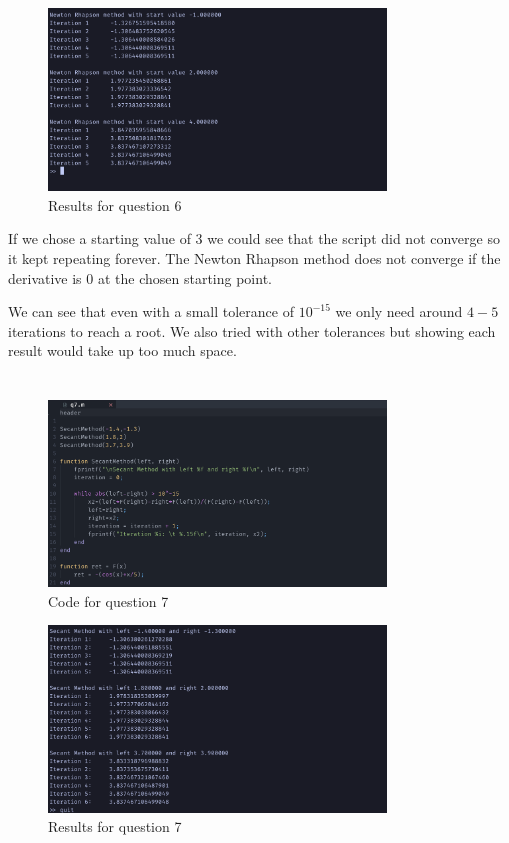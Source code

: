 \documentclass{article}
\begin{document}
\begin{figure}[H]
	\centering
	\includegraphics[width=0.8\textwidth]{imgs/q6_results.png}
	\caption{Results for question 6}
	\label{fig:q6_result}
\end{figure}

If we chose a starting value of 3 we could see that the script did not converge so it kept repeating forever. The Newton Rhapson method does not converge if the derivative is $0$ at the chosen starting point.

We can see that even with a small tolerance of $10^{-15}$ we only need around $4-5$ iterations to reach a root. We also tried with other tolerances but showing each result would take up too much space.

\newpage
\section{}
\begin{figure}[H]
	\centering
	\includegraphics[width=0.8\textwidth]{imgs/q7_code.png}
	\caption{Code for question 7}
	\label{fig:q7_code}
\end{figure}

\begin{figure}[H]
	\centering
	\includegraphics[width=0.8\textwidth]{imgs/q7_results.png}
	\caption{Results for question 7}
	\label{fig:q7_result}
\end{figure}
\end{document}

